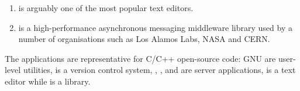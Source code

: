 \begin{enumerate}
\item[\vim\footnote{\url{http://www.vim.org/}}] is arguably one of the most
popular text editors.

\item[\zeromq\footnote{\url{http://zeromq.org/}}]
is a high-performance asynchronous messaging middleware library used by a
number of organisations such as Los Alamos Labs, NASA and CERN.


\end{enumerate}

The \numSystems applications are representative for C/C++ open-source code: GNU
\binutils are user-level utilities, \git is a version control system,
\beanstalkd, \lighttpdtwo, \memcached and \redis are server applications, \vim
is a text editor while \zeromq is a library.

